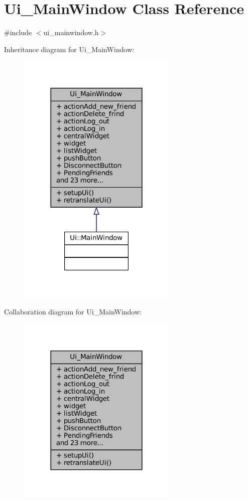\hypertarget{classUi__MainWindow}{}\section{Ui\+\_\+\+Main\+Window Class Reference}
\label{classUi__MainWindow}


{\ttfamily \#include $<$ui\+\_\+mainwindow.\+h$>$}



Inheritance diagram for Ui\+\_\+\+Main\+Window\+:
\nopagebreak
\begin{figure}[H]
\begin{center}
\leavevmode
\includegraphics[width=216pt]{classUi__MainWindow__inherit__graph}
\end{center}
\end{figure}


Collaboration diagram for Ui\+\_\+\+Main\+Window\+:
\nopagebreak
\begin{figure}[H]
\begin{center}
\leavevmode
\includegraphics[width=216pt]{classUi__MainWindow__coll__graph}
\end{center}
\end{figure}
